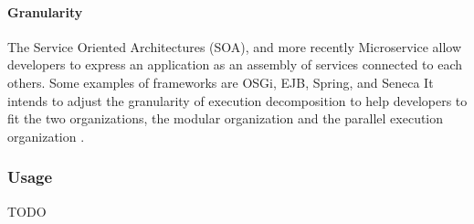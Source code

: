 

\paragraph{Granularity}

The Service Oriented Architectures (SOA), and more recently Microservice\cite{Namiot2014,Fernandez-Villamor2010,Fowler2014,Namiot2014} allow developers to express an application as an assembly of services connected to each others.
Some examples of frameworks are OSGi, EJB, Spring, and Seneca
It intends to adjust the granularity of execution decomposition to help developers to fit the two organizations, the modular organization and the parallel execution organization \cite{Adam2008}.









\subsubsection{Usage}


TODO


